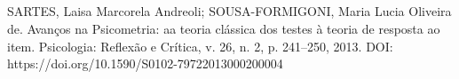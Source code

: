 

\begin{anexosenv}

\chapter{}


SARTES, Laisa Marcorela Andreoli; SOUSA-FORMIGONI, Maria Lucia Oliveira de. 
Avanços na Psicometria: aa teoria clássica dos testes à teoria de resposta ao item. 
Psicologia: Reflexão e Crítica, v. 26, n. 2, p. 241–250, 2013. DOI: 
https://doi.org/10.1590/S0102-79722013000200004

\end{anexosenv}